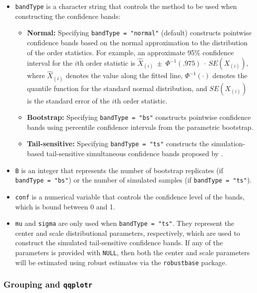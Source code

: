 \begin{itemize}
\item
  \texttt{bandType} is a character string that controls the method to be
  used when constructing the confidence bands:

  \begin{itemize}
  \tightlist
  \item
    \textbf{Normal:} Specifying \texttt{bandType\ =\ "normal"} (default)
    constructs pointwise confidence bands based on the normal
    approximation to the distribution of the order statistics. For
    example, an approximate 95\% confidence interval for the \(i\)th
    order statistic is
    \(\widehat{X}_{(i)}~\pm~\Phi^{-1}(.975)~\cdot~SE(X_{(i)})\), where
    \(\widehat{X}_{(i)}\) denotes the value along the fitted line,
    \(\Phi^{-1}(\cdot)\) denotes the quantile function for the standard
    normal distribution, and \(SE(X_{(i)})\) is the standard error of
    the \(i\)th order statistic.
  \item
    \textbf{Bootstrap:} Specifying \texttt{bandType\ =\ "bs"} constructs
    pointwise confidence bands using percentile confidence intervals
    from the parametric bootstrap.
  \item
    \textbf{Tail-sensitive:} Specifying \texttt{bandType\ =\ "ts"}
    constructs the simulation-based tail-sensitive simultaneous
    confidence bands proposed by \citet{Aldor-Noiman2013-xw}.
  \end{itemize}
\item
  \texttt{B} is an integer that represents the number of bootstrap
  replicates (if \texttt{bandType\ =\ "bs"}) or the number of simulated
  samples (if \texttt{bandType\ =\ "ts"}).
\item
  \texttt{conf} is a numerical variable that controls the confidence
  level of the bands, which is bound between 0 and 1.
\item
  \texttt{mu} and \texttt{sigma} are only used when
  \texttt{bandType\ =\ "ts"}. They represent the center and scale
  distributional parameters, respectively, which are used to construct
  the simulated tail-sensitive confidence bands. If any of the
  parameters is provided with \texttt{NULL}, then both the center and
  scale parameters will be estimated using robust estimates via the
  \texttt{robustbase} package.
\end{itemize}

\subsubsection{\texorpdfstring{Grouping and
\texttt{qqplotr}}{Grouping and qqplotr}}\label{grouping-and-qqplotr}

